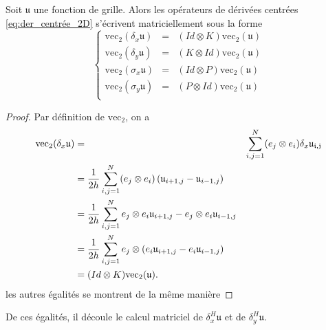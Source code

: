 \begin{proposition}
Soit $\mathfrak{u}$ une fonction de grille. Alors les opérateurs de dérivées centrées \eqref{eq:der_centrée_2D} s'écrivent matriciellement sous la forme
\begin{equation}
\left\lbrace
\begin{array}{rcl}
\text{vec}_2(\delta_x \mathfrak{u}) & = & (Id \otimes K) \text{vec}_2(\mathfrak{u})\\
\text{vec}_2(\delta_y \mathfrak{u}) & = & (K \otimes Id) \text{vec}_2(\mathfrak{u})\\
\text{vec}_2(\sigma_x \mathfrak{u}) & = & (Id \otimes P) \text{vec}_2(\mathfrak{u})\\
\text{vec}_2(\sigma_y \mathfrak{u}) & = & (P \otimes Id) \text{vec}_2(\mathfrak{u})\\
\end{array}\right.
\end{equation}
\label{prop:op_der_simpson_mat}
\end{proposition}

\begin{proof}
Par définition de $\text{vec}_2$, on a 
\begin{align*}
\text{vec}_2 (\delta_x \mathfrak{u}) &=& \displaystyle\sum\limits_{i,j=1}^N (e_j \otimes e_i) \delta_x \mathfrak{u_{i,j}} \\
	&= \dfrac{1}{2h} \displaystyle\sum\limits_{i,j=1}^N (e_j \otimes e_i) \left( \mathfrak{u}_{i+1,j} - \mathfrak{u}_{i-1,j} \right) \\
	&= \dfrac{1}{2h} \displaystyle\sum\limits_{i,j=1}^N e_j \otimes e_i \mathfrak{u}_{i+1,j} - e_j \otimes e_i \mathfrak{u}_{i-1,j}\\
	&= \dfrac{1}{2h} \displaystyle\sum\limits_{i,j=1}^N e_j \otimes (e_i \mathfrak{u}_{i+1,j}-e_i \mathfrak{u}_{i-1,j}) \\
	&= (Id \otimes K) \text{vec}_2(\mathfrak{u}).
\end{align*}
les autres égalités se montrent de la même manière
\end{proof}

De ces égalités, il découle le calcul matriciel de $\delta_x^H \mathfrak{u}$ et de $\delta_y^H \mathfrak{u}$.

